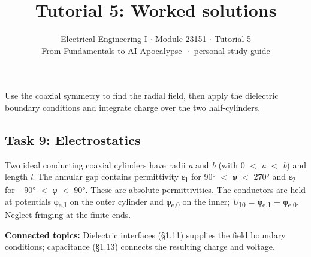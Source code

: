 \documentclass[11pt]{article}
\title{\sffamily\bfseries\color{FAUblue}Tutorial 5: Worked solutions}
\author{Electrical Engineering I \ensuremath{\cdot} Module 23151 \ensuremath{\cdot} Tutorial 5\\[2pt]\small From Fundamentals to AI Apocalypse · personal study guide}
\date{}
\begin{document}
\maketitle
\begingroup\footnotesize\setlength{\parskip}{0pt}\tableofcontents\endgroup
\clearpage

{\large Use the coaxial symmetry to find the radial field, then apply the dielectric boundary conditions and integrate charge over the two half-cylinders.}


\begin{keepsection}
\section{Task 9: Electrostatics}

Two ideal conducting coaxial cylinders have radii \textit{a} and \textit{b} (with 0 \ensuremath{<} \textit{a} \ensuremath{<} \textit{b}) and length \textit{l}. The annular gap contains permittivity ε\textsubscript{1} for 90° \ensuremath{<} \textit{φ} \ensuremath{<} 270° and ε\textsubscript{2} for \ensuremath{-}90° \ensuremath{<} \textit{φ} \ensuremath{<} 90°. These are absolute permittivities. The conductors are held at potentials φ\textsubscript{e,1} on the outer cylinder and φ\textsubscript{e,0} on the inner; \textit{U}\textsubscript{10} = φ\textsubscript{e,1} \ensuremath{-} φ\textsubscript{e,0}. Neglect fringing at the finite ends.

\textbf{Connected topics:} Dielectric interfaces (§1.11) supplies the field boundary conditions; capacitance (§1.13) connects the resulting charge and voltage.


\end{keepsection}
\end{document}
